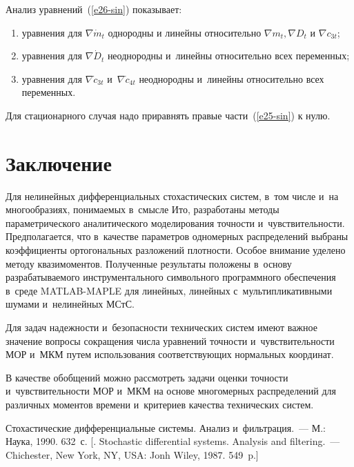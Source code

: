 \begin{multicols}{2}
Анализ уравнений~(\ref{e26-sin}) показывает:
\begin{enumerate}[(1)]
\item уравнения для  $\nabla \dot m_t$ однородны и линейны
относительно $\nabla m_t, \nabla D_t$ и $\nabla c_{3t}$;

\item  уравнения для  $\nabla \dot D_t$ неоднородны
и~линейны относительно всех переменных;

\item  уравнения для  $\nabla \dot c_{3t}$ и~$\nabla \dot c_{4t}$
неоднородны и~линейны относительно всех переменных.
\end{enumerate}

Для стационарного случая надо приравнять правые части~(\ref{e25-sin}) к нулю.

\vspace*{-6pt}

\section{Заключение}

Для нелинейных дифференциальных стохастических систем, в~том числе
и~на многообразиях, понимаемых в~смысле Ито, разработаны  методы параметрического
аналитического моделирования точности и~чувствительности. Предполагается, что
в~качестве параметров одномерных распределений выбраны коэффициенты ортогональных
разложений плотности. Особое внимание уделено методу квазимоментов.
Полученные результаты положены в~основу разрабатываемого инструментального
символьного программного обеспечения в~среде MATLAB-MAPLE для линейных, линейных
с~мультипликативными шумами и~нелинейных МСтС.

Для задач надежности и~безопасности технических систем имеют
важное значение вопросы сокращения числа уравнений точности и~чувствительности МОР
и~МКМ  путем использования соответствующих нормальных координат.


В качестве обобщений можно рассмотреть задачи оценки точности
и~чувствительности МОР и~МКМ на основе многомерных распределений для различных
моментов времени и~критериев качества технических систем.

\vspace*{-6pt}


{\small\frenchspacing
 {%
 \begin{thebibliography}{99}

Стохастические дифференциальные системы. Анализ и~фильтрация.~--- М.:
Наука,  1990.  632~с. [. Stochastic differential systems.
Analysis and filtering.~--- Chichester, New York, NY, USA: Jonh Wiley, 1987.
549~p.]



\end{thebibliography}}}
\end{multicols}
